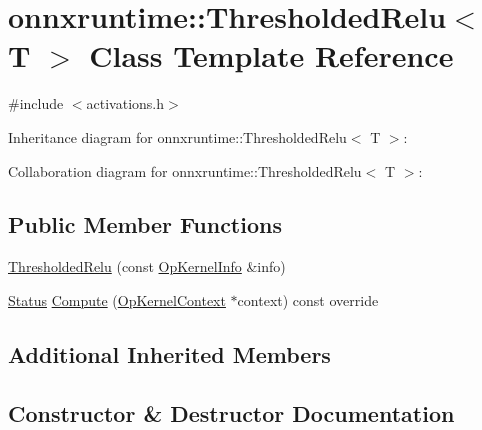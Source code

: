 \hypertarget{classonnxruntime_1_1ThresholdedRelu}{}\section{onnxruntime\+:\+:Thresholded\+Relu$<$ T $>$ Class Template Reference}
\label{classonnxruntime_1_1ThresholdedRelu}


{\ttfamily \#include $<$activations.\+h$>$}



Inheritance diagram for onnxruntime\+:\+:Thresholded\+Relu$<$ T $>$\+:


Collaboration diagram for onnxruntime\+:\+:Thresholded\+Relu$<$ T $>$\+:
\subsection*{Public Member Functions}
\begin{DoxyCompactItemize}
\item 
\mbox{\hyperlink{classonnxruntime_1_1ThresholdedRelu_a7e4eda8b6ceb2c32a1eca3241390dfde}{Thresholded\+Relu}} (const \mbox{\hyperlink{classonnxruntime_1_1OpKernelInfo}{Op\+Kernel\+Info}} \&info)
\item 
\mbox{\hyperlink{classonnxruntime_1_1common_1_1Status}{Status}} \mbox{\hyperlink{classonnxruntime_1_1ThresholdedRelu_a95b8d6d4fec428f90a40b42e3667e13b}{Compute}} (\mbox{\hyperlink{classonnxruntime_1_1OpKernelContext}{Op\+Kernel\+Context}} $\ast$context) const override
\end{DoxyCompactItemize}
\subsection*{Additional Inherited Members}


\subsection{Constructor \& Destructor Documentation}
\mbox{\label{classonnxruntime_1_1ThresholdedRelu_a7e4eda8b6ceb2c32a1eca3241390dfde}} 

